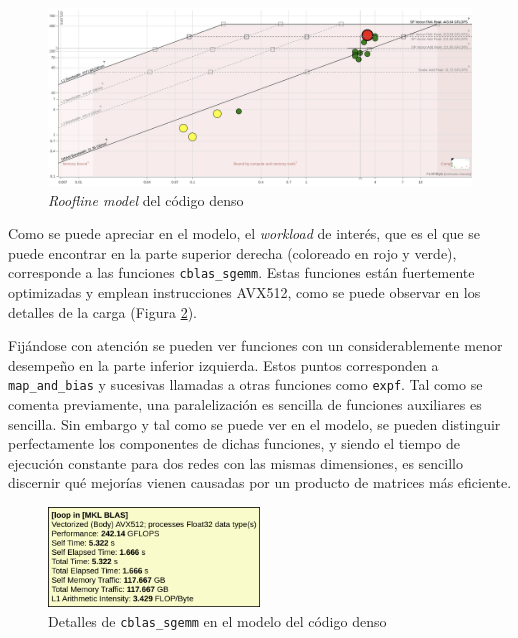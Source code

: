 \begin{figure}[h!]
    \centering
    \includegraphics[width=\textwidth]{img/roofline_dense.png}
    \caption{\textit{Roofline model} del código denso}
    \label{fig:roofline_dense}
\end{figure}

Como se puede apreciar en el modelo, el \textit{workload} de interés, que es el que se puede encontrar en la parte superior derecha (coloreado en rojo y verde), corresponde a las funciones \texttt{cblas\_sgemm}. Estas funciones están fuertemente optimizadas y emplean instrucciones AVX512, como se puede observar en los detalles de la carga (Figura \ref{fig:roofline_dense_details}).

Fijándose con atención se pueden ver funciones con un considerablemente menor desempeño en la parte inferior izquierda. Estos puntos corresponden a \texttt{map\_and\_bias} y sucesivas llamadas a otras funciones como \texttt{expf}. Tal como se comenta previamente, una paralelización es sencilla de funciones auxiliares es sencilla. Sin embargo y tal como se puede ver en el modelo, se pueden distinguir perfectamente los componentes de dichas funciones, y siendo el tiempo de ejecución constante para dos redes con las mismas dimensiones, es sencillo discernir qué mejorías vienen causadas por un producto de matrices más eficiente.    

\begin{figure}[h!]
    \centering
    \includegraphics[width=0.5\textwidth]{img/roofline_dense_details.png}
    \caption{Detalles de \texttt{cblas\_sgemm} en el modelo del código denso}
    \label{fig:roofline_dense_details}
\end{figure}

